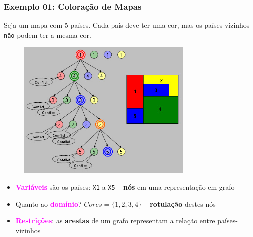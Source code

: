 \begin{frame}[fragile]

\frametitle{Exemplo 01: Coloração de Mapas}

\begin{footnotesize}
Seja um mapa com 5 países. Cada país deve ter uma cor, mas os países
vizinhos \texttt{não} podem ter a mesma cor. 
\end{footnotesize}

\begin{figure}[!htb]
\begin{center}
\includegraphics[width=0.750\textwidth, height=0.50\textheight]{figures/coloracao_01.jpg}
\end{center}
\end{figure}

\begin{footnotesize}
\begin{itemize}
  \item \textcolor{magenta}{\textbf{Variáveis}} são os países: \texttt{X1} a \texttt{X5} -- \textbf{nós} em uma representação em grafo 
  \item Quanto ao  \textcolor{magenta}{\textbf{domínio}}? $Cores =\{1,2,3,4\}$ -- \textbf{rotulação} destes nós
  \item \textcolor{magenta}{\textbf{Restrições}}: as \textbf{arestas} de um grafo representam a relação entre países-vizinhos
\end{itemize}
\end{footnotesize}
    
\end{frame}


